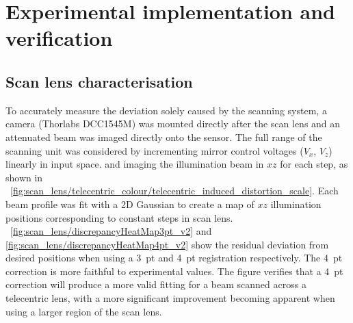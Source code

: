 \fi
\section{Experimental implementation and verification}


\subsection{Scan lens characterisation}

To accurately measure the deviation solely caused by the scanning system, a camera (Thorlabs DCC1545M) was mounted directly after the scan lens and an attenuated beam was imaged directly onto the sensor.
The full range of the scanning unit was considered by incrementing mirror control voltages ($V_x$, $V_z$) linearly in input space.
and imaging the illumination beam in $xz$ for each step,
as shown in \figurename~\ref{fig:scan_lens/telecentric_colour/telecentric_induced_distortion_scale}.
Each beam profile was fit with a 2D Gaussian to create a map of $xz$ illumination positions corresponding to constant steps in scan lens.
\figurename~\ref{fig:scan_lens/discrepancyHeatMap3pt_v2} and \ref{fig:scan_lens/discrepancyHeatMap4pt_v2} show the residual deviation from desired positions when using a 3~pt and 4~pt registration respectively.
The 4~pt correction is more faithful to experimental values.
The figure verifies that a 4~pt correction %
will produce a more valid fitting for a beam scanned across a telecentric lens, with a more significant improvement becoming apparent when using a larger region of the scan lens.

